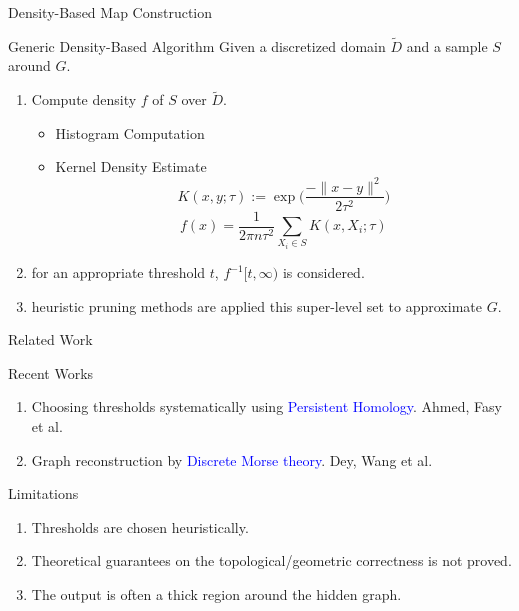 \documentclass[9pt,sans-serif]{beamer}
\begin{document}
\begin{frame}{Density-Based Map Construction}
  \begin{block}{Generic Density-Based Algorithm}
    Given a discretized domain $\tilde D$ and a sample $S$ around $G$.
    \begin{enumerate}
    \item Compute density $f$ of $S$ over $\tilde D$. \\
      \pause
      \begin{itemize}
        \color{blue}
      \item
        {Histogram Computation}
        \pause
      \item Kernel Density Estimate
        $$K(x,y;\tau):=\exp\bigg(\frac{-\|x-y\|^2}{2\tau^2}\bigg)$$
        $$f(x)=\frac{1}{2\pi n\tau^2}\sum_{X_i\in S} K(x,X_i;\tau)$$
      \end{itemize}
      \pause
    \item for an appropriate threshold $t$, $f^{-1}[t,\infty)$ is considered.
      \pause
    \item heuristic pruning methods are applied this super-level set to
      approximate $G$.
    \end{enumerate}
  \end{block}
\end{frame}

\begin{frame}{Related Work}
  \begin{block}{Recent Works}
    \begin{enumerate}
    \item Choosing thresholds systematically using
      \textcolor{blue}{Persistent Homology}.
      Ahmed, Fasy et al. \cite{Ahmed:2015:CTD:2820783.2820810}
      \pause
    \item Graph reconstruction by \textcolor{blue}{Discrete Morse theory}.
      Dey, Wang et al.\cite{dey_graph_2018_socg}
    \end{enumerate}
  \end{block}

  \pause
  
  \begin{block}{Limitations}
    \begin{enumerate}
    \item Thresholds are chosen heuristically.
      \pause
    \item Theoretical guarantees on the topological/geometric correctness is not
      proved.
      \pause
    \item The output is often a thick region around the hidden graph.
    \end{enumerate}
  \end{block}
\end{frame}
\end{document}
